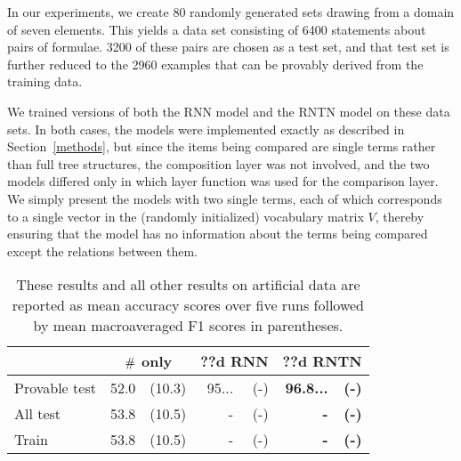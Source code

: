 In our experiments, we create 80 randomly generated sets drawing from
a domain of seven elements. This yields a data set consisting of
6400 statements about pairs of formulae. 3200 of these pairs are
chosen as a test set, and that test set is further reduced to the 2960
examples that can be provably derived from the training data.

We trained versions of both the RNN model and the RNTN model on these
data sets. In both cases, the models were implemented exactly as
described in Section~\ref{methods}, but since the items being compared
are single terms rather than full tree structures, the composition
layer was not involved, and the two models differed only in which
layer function was used for the comparison layer. We simply present
the models with two single terms, each of which corresponds to a
single vector in the (randomly initialized) vocabulary matrix $V$,
thereby ensuring that the model has no information about the terms
being compared except the relations between them.

\begin{table}[tp]
  \centering \small
  \begin{tabular}{ l r@{ \ }r r@{ \ }r r@{ \ }r }
    \toprule
    ~&\multicolumn{2}{c}{$\mathbin{\#}$ only} & \multicolumn{2}{c}{??d RNN}  & \multicolumn{2}{c}{??d RNTN}\\
    \midrule
    Provable test &52.0 &(10.3) &	95...&(-)& \textbf{96.8...} & \textbf{(-)}\\
    All test &53.8 &(10.5) &	-&(-)& \textbf{-} & \textbf{(-)}\\
    Train &53.8 &(10.5)    & -&(-)& \textbf{-} & \textbf{(-)}\\

    \bottomrule
  \end{tabular}
  \caption{ These results and all other results on artificial data are reported as mean accuracy scores over five runs followed by mean macroaveraged F1 scores in parentheses.}
  \label{joinresultstable}
\end{table}

